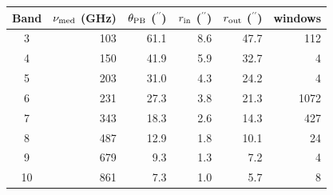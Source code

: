 \begin{tabular}{@{}crrrrr@{}}
\toprule
Band & $\nu_{\rm med}$ (GHz) & $\theta_{\rm PB}$ ($^{\prime\prime}$) & $r_{\rm in}$ ($^{\prime\prime}$) & $r_{\rm out}$ ($^{\prime\prime}$) & windows \\
\midrule
3 & 103 & 61.1 & 8.6 & 47.7 & 112 \\
4 & 150 & 41.9 & 5.9 & 32.7 & 4 \\
5 & 203 & 31.0 & 4.3 & 24.2 & 4 \\
6 & 231 & 27.3 & 3.8 & 21.3 & 1072 \\
7 & 343 & 18.3 & 2.6 & 14.3 & 427 \\
8 & 487 & 12.9 & 1.8 & 10.1 & 24 \\
9 & 679 & 9.3 & 1.3 & 7.2 & 4 \\
10 & 861 & 7.3 & 1.0 & 5.7 & 8 \\
\bottomrule
\end{tabular}
